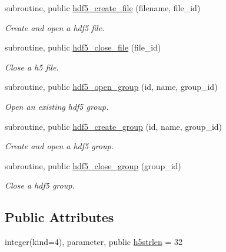\begin{DoxyCompactItemize}
subroutine, public \hyperlink{classmodhdf5_a66cf3f318aafac811c2422f8155f7ae1}{hdf5\-\_\-create\-\_\-file} (filename, file\-\_\-id)
\begin{DoxyCompactList}\small\item\em Create and open a hdf5 file. \end{DoxyCompactList}\item 
subroutine, public \hyperlink{classmodhdf5_af70ee678ccdc5ce829431ebe909264a9}{hdf5\-\_\-close\-\_\-file} (file\-\_\-id)
\begin{DoxyCompactList}\small\item\em Close a h5 file. \end{DoxyCompactList}\item 
subroutine, public \hyperlink{classmodhdf5_ae547666d0167e2a78d6529e11c1faa92}{hdf5\-\_\-open\-\_\-group} (id, name, group\-\_\-id)
\begin{DoxyCompactList}\small\item\em Open an existing hdf5 group. \end{DoxyCompactList}\item 
subroutine, public \hyperlink{classmodhdf5_a5486f9c861f7b8ee2060015acf0169a4}{hdf5\-\_\-create\-\_\-group} (id, name, group\-\_\-id)
\begin{DoxyCompactList}\small\item\em Create and open a hdf5 group. \end{DoxyCompactList}\item 
subroutine, public \hyperlink{classmodhdf5_aba547bfdd3dc38385069b0885ab5d526}{hdf5\-\_\-close\-\_\-group} (group\-\_\-id)
\begin{DoxyCompactList}\small\item\em Close a hdf5 group. \end{DoxyCompactList}\end{DoxyCompactItemize}
\subsection*{Public Attributes}
\begin{DoxyCompactItemize}
\item 
integer(kind=4), parameter, public \hyperlink{classmodhdf5_a74fed11716b5063ece33a584a5872f7a}{h5strlen} = 32
\end{DoxyCompactItemize}
